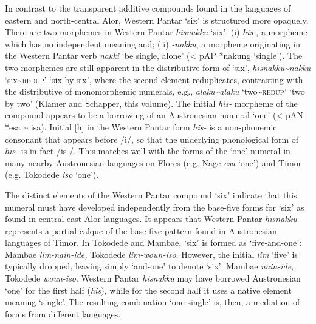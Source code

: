 In contrast to the transparent additive compounds found in the languages of eastern and north-central Alor, Western Pantar `six' is structured more opaquely. There are two morphemes in Western Pantar \textit{hisnakku}\textit{{\ng}} `six': (i) \textit{his-}, a morpheme which has no independent meaning and; (ii) \textit{{}-nakku}\textit{{\ng}}, a morpheme originating in the Western Pantar verb \textit{nakki}\textit{{\ng}} `be single, alone' ({\textless} pAP *nakung `single'). The two morphemes are still apparent in the distributive form of `six', \textit{hisnakku}\textit{{\ng}}\textit{\~{}nakku}\textit{{\ng}} `six\~{}\textsc{redup}' `six by six', where the second element reduplicates, contrasting with the distributive of monomorphemic numerals, e.g., \textit{alaku\~{}alaku} `two\~{}\textsc{redup}' `two by two' (Klamer and Schapper, this volume). The initial \textit{his-} morpheme of the compound appears to be a borrowing of an Austronesian numeral `one' ({\textless} pAN *esa \~{} isa). Initial [h] in the Western Pantar form \textit{his-} is a non-phonemic consonant that appears before /i/, so that the underlying phonological form of \textit{his-} is in fact /is-/. This matches well with the forms of the `one' numeral in many nearby Austronesian languages on Flores (e.g. Nage \textit{esa} `one') and Timor (e.g. Tokodede \textit{iso} `one'). 

The distinct elements of the Western Pantar compound `six' indicate that this numeral must have developed independently from the base-five forms for `six' as found in central-east Alor languages. It appears that Western Pantar \textit{hisnakku}\textit{{\ng}} represents a partial calque of the base-five pattern found in Austronesian languages of Timor. In Tokodede and Mambae, `six' is formed as `five-and-one': Mambae \textit{lim-nain-ide,} Tokodede \textit{lim-woun-iso}. However, the initial \textit{lim} `five' is typically dropped, leaving simply `and-one' to denote `six': Mambae \textit{nain-ide,} Tokodede \textit{woun-iso}. Western Pantar \textit{hisnakku}\textit{{\ng}} may have borrowed Austronesian `one' for the first half (\textit{his})\textit{,} while for the second half it uses a native element meaning `single'. The resulting combination `one-single' is, then, a mediation of forms from different languages.

